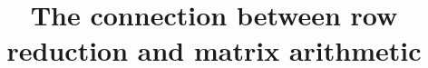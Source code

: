 \documentclass[17pt]{amsart}
\newcommand{\bzero}{\mathbf{0}}
\begin{document}
\title{The connection between row reduction and matrix arithmetic}










\end{document}
